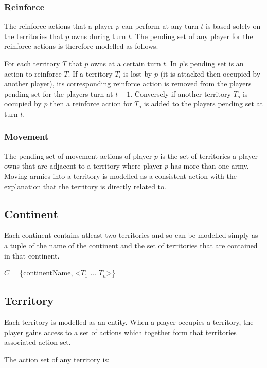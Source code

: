 \documentclass[parskip]{cs4rep}
\begin{document}
\subsubsection{Reinforce}

The reinforce actions that a player $p$ can perform at any turn $t$ is based solely on the territories that $p$ owns during turn $t$. The pending set of any player for the reinforce actions is therefore modelled as follows. 

For each territory $T$ that $p$ owns at a certain turn $t$. In $p$'s pending set is an action to reinforce $T$. If a territory $T_{l}$ is lost by $p$ (it is attacked then occupied by another player), its corresponding reinforce action is removed from the players pending set for the players turn at $t+1$. Conversely if another territory $T_{o}$ is occupied by $p$ then a reinforce action for $T_{o}$ is added to the players pending set at turn $t$.

\subsubsection{Movement}

The pending set of movement actions of player $p$ is the set of territories a player owns that are adjacent to a territory where player $p$ has more than one army. Moving armies into a territory is modelled as a consistent action with the explanation that the territory is directly related to.

\subsection{Continent}

Each continent contains atleast two territories and so can be modelled simply as a tuple of the name of the continent and the set of territories that are contained in that continent.

$C$ = \{continentName, <$T_{1}$ ... $T_{n}$>\}

\subsection{Territory}

Each territory is modelled as an entity. When a player occupies a territory, the player gains access to a set of actions which together form that territories associated action set.

The action set of any territory is:
\end{document}

